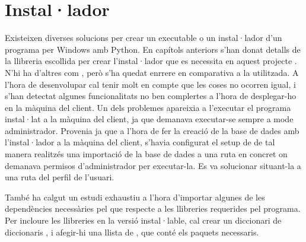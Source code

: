 \documentclass[letterpaper,11pt,catalan]{sphinxmanual}
\begin{document}
\begin{sphinxVerbatim}[commandchars=\\\{\}]
 
 
\end{sphinxVerbatim}


\section{Instal·lador}
\label{\detokenize{index:installador}}
Existeixen diverses solucions per crear un executable o un instal·lador d'un programa
per Windows amb Python. En capítols anteriors s'han donat detalls de la llibreria escollida
per crear l'instal·lador que es necessita en aquest projecte . N'hi ha d'altres
com , però s'ha quedat enrrere en comparativa a la utilitzada.
A l'hora de desenvolupar cal tenir molt en compte que les coses no ocorren igual, i s'han detectat
algunes funcionalitats no ben complertes a l'hora de desplegar-ho en la màquina del client.
Un dels problemes apareixia a l'executar el programa instal·lat a la màquina del client, ja
que demanava executar-se sempre a mode administrador. Provenia ja que a l'hora de fer la creació de la base de dades
amb l'instal·lador a la màquina del client, s'havia configurat el setup de  de tal manera realitzés una importació de la
base de dades a una ruta en concret on demanava permisos d'administrador per executar-la. Es va solucionar
situant-la a una ruta del perfil de l'usuari.

També ha calgut un estudi exhaustiu a l'hora d'importar algunes de les dependències necessàries pel que
respecte a les llibreries requerides pel programa. Per incloure les llibreries en la versió instal·lable,
cal crear un diccionari de diccionaris , i afegir-hi una llista de , que conté els paquets necessaris.
\end{document}
